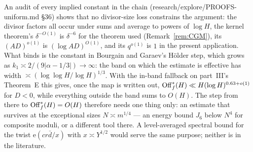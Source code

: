 \documentclass[11pt,a4paper]{article}
\begin{document}
\begin{remark}
An audit of every implied constant in the chain (research/explore/PROOFS-uniform.md §36) shows that no divisor-size loss constrains the argument: the divisor factors all occur
under sums and average to powers of $\log H$, the kernel theorem's $\delta^{-O(1)}$ is $\delta^{-6}$ for the theorem used (Remark~\ref{rem:CGM}), its $(AD)^{o(1)}$ is $(\log AD)^{O(1)}$, and its $q^{o(1)}$ is $1$ in the
present application. What binds is the constant in Bourgain and Garaev's H\"older step, which grows as $k_1\asymp 2/(9|\alpha-1/3|)\to\infty$: the band on which the estimate is
effective has width $\asymp(\log\log H/\log H)^{1/3}$. With the in-band fallback on part~III's Theorem~E this gives, once the map is written out,
$\mathrm{Off}^\ast_f(H)\ll H(\log H)^{0.63+o(1)}$ for $D<0$, while everything outside the band sums to $O(H)$. The step from there to $\mathrm{Off}^\ast_f(H)=O(H)$ therefore needs one thing only:
an estimate that survives at the exceptional sizes $N\asymp m^{1/4}$ --- an energy bound $J_6$ below $N^4$ for composite moduli, or a different tool there. A level-averaged
spectral bound for the twist $\mathrm{e}(cr\bar d/x)$ with $x\asymp Y^{1/2}$ would serve the same purpose; neither is in the literature.
\end{remark}


\end{document}
